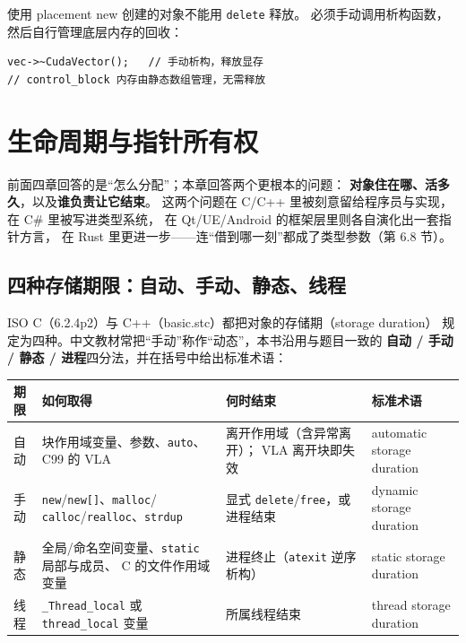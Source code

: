 \documentclass[12pt,a4paper,fontset=fandol]{ctexbook}
\begin{document}
\begin{warning}[title=混合方案的析构]
使用 placement new 创建的对象不能用 \texttt{delete} 释放。
必须手动调用析构函数，然后自行管理底层内存的回收：
\begin{lstlisting}
vec->~CudaVector();   // 手动析构，释放显存
// control_block 内存由静态数组管理，无需释放
\end{lstlisting}
\end{warning}

\chapter{生命周期与指针所有权}

前面四章回答的是``怎么分配''；本章回答两个更根本的问题：
\textbf{对象住在哪、活多久}，以及\textbf{谁负责让它结束}。
这两个问题在 C/C++ 里被刻意留给程序员与实现，在 C\# 里被写进类型系统，
在 Qt/UE/Android 的框架层里则各自演化出一套指针方言，
在 Rust 里更进一步——连``借到哪一刻''都成了类型参数（第 6.8 节）。

\section{四种存储期限：自动、手动、静态、线程}

ISO C（6.2.4p2）与 C++（basic.stc）都把对象的存储期（storage duration）
规定为四种。中文教材常把``手动''称作``动态''，本书沿用与题目一致的
\textbf{自动 / 手动 / 静态 / 进程}四分法，并在括号中给出标准术语：

\begin{longtable}{@{}>{\raggedright\arraybackslash}p{}>{\raggedright\arraybackslash}p{}>{\raggedright\arraybackslash}p{}>{\raggedright\arraybackslash}p{}@{}}
\toprule
\textbf{期限} & \textbf{如何取得} & \textbf{何时结束} & \textbf{标准术语} \\
\midrule
自动 & 块作用域变量、参数、\texttt{auto}、
  C99 的 VLA & 离开作用域（含异常离开）；
  VLA 离开块即失效 & automatic storage duration \\
\addlinespace
手动 & \texttt{new}/\allowbreak{}\texttt{new[]}、\texttt{malloc}/
  \texttt{calloc}/\allowbreak{}\texttt{realloc}、\texttt{strdup} &
  显式 \texttt{delete}/\allowbreak{}\texttt{free}，或进程结束 &
  dynamic storage duration \\
\addlinespace
静态 & 全局/命名空间变量、\texttt{static} 局部与成员、
  C 的文件作用域变量 & 进程终止（\texttt{atexit} 逆序析构） &
  static storage duration \\
\addlinespace
线程 & \texttt{\_Thread\_local} 或 \texttt{thread\_local} 变量 &
  所属线程结束 &
  thread storage duration \\
\bottomrule
\end{longtable}
\end{document}
